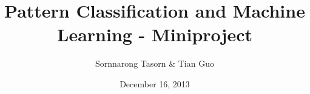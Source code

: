 \documentclass[10pt,a4paper,oneside]{article}
\title{Pattern Classification and Machine Learning - Miniproject}
\author{Sornnarong Tasorn \& Tian Guo}
\date{December 16, 2013}
\begin{document}

\maketitle	
{}
	 



\label{lastpage}
\end{document}
